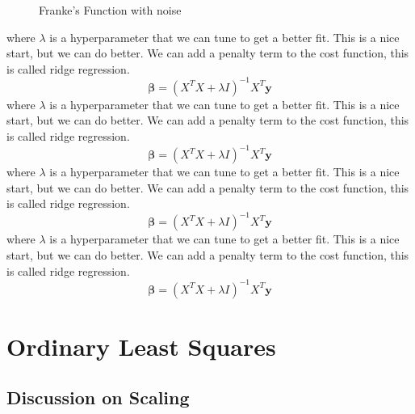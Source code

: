 \documentclass[twoside,11pt]{report}
\begin{document}
\begin{figure}
\begin{center}
    \begin{adjustbox}{clip,trim=4cm 3.4cm 3cm 4.8cm, max width=0.3\textwidth}
    
    \end{adjustbox}
    \caption{\small Franke's Function with noise}
    \label{frankfuncnoise}
    \end{center}
\end{figure}



where $\lambda$ is a hyperparameter that we can tune to get a better fit. This is a nice start, but we can do better. We can add a penalty term to the cost function, this is called ridge regression.
\begin{equation}
    \boldsymbol{\beta} = (X^T X + \lambda I)^{-1} X^T \boldsymbol{y}
\end{equation}
where $\lambda$ is a hyperparameter that we can tune to get a better fit. This is a nice start, but we can do better. We can add a penalty term to the cost function, this is called ridge regression.
\begin{equation}
    \boldsymbol{\beta} = (X^T X + \lambda I)^{-1} X^T \boldsymbol{y}
\end{equation}
where $\lambda$ is a hyperparameter that we can tune to get a better fit. This is a nice start, but we can do better. We can add a penalty term to the cost function, this is called ridge regression.
\begin{equation}
    \boldsymbol{\beta} = (X^T X + \lambda I)^{-1} X^T \boldsymbol{y}
\end{equation}
where $\lambda$ is a hyperparameter that we can tune to get a better fit. This is a nice start, but we can do better. We can add a penalty term to the cost function, this is called ridge regression.
\begin{equation}
    \boldsymbol{\beta} = (X^T X + \lambda I)^{-1} X^T \boldsymbol{y}
\end{equation}





\section{Ordinary Least Squares}
\subsection{Discussion on Scaling}
\end{document}
